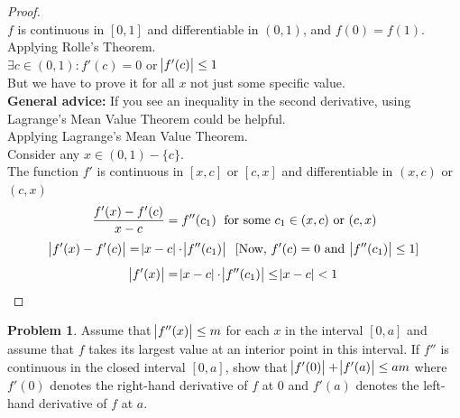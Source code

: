 \documentclass[14]{article}
\theoremstyle{definition}
\newtheorem{prob}{Problem}
\theoremstyle{case}
\begin{document}
\begin{proof} $\text{}$\\
$f$ is continuous in $[0, 1]$ and differentiable in $(0, 1)$, and $f(0) = f(1)$. Applying Rolle's Theorem.\\
$\exists c \in (0, 1) : f'(c) = 0$ or $\abs{f'(c)} \leq 1$\\
But we have to prove it for all $x$ not just some specific value.\\
\textbf{General advice:} If you see an inequality in the second derivative, using Lagrange's Mean Value Theorem could be helpful.\\
Applying Lagrange's Mean Value Theorem.\\
Consider any $x \in (0, 1) - \{c\}$.\\
The function $f'$ is continuous in $[x, c]$ or $[c, x]$ and differentiable in $(x, c)$ or $(c, x)$
\[\dfrac{f'(x) - f'(c)}{x - c} = f''(c_1) \text{\; for some } c_1 \in (x, c) \text{ or } (c, x)\]
\[\abs{f'(x) - f'(c)} = \abs{x - c} \cdot \abs{f''(c_1)} \;\; [\text{Now, } f'(c) = 0 \text{ and } \abs{f''(c_1)} \leq 1 ]\]
\[\abs{f'(x)} = \abs{x - c} \cdot \abs{f''(c_1)} \leq \abs{x - c} < 1\]
\end{proof}
\pagebreak
\begin{prob}
Assume that $\abs{f''(x)} \leq m$ for each $x$ in the interval $[0, a]$ and assume that $f$ takes its largest value at an interior point in this interval. If $f''$ is continuous in the closed interval $[0, a]$, show that $\abs{f'(0)} + \abs{f'(a)}\leq am$ where $f'(0)$ denotes the right-hand derivative of $f$ at $0$ and $f'(a)$ denotes the left-hand derivative of $f$ at $a$.
\end{prob}
\end{document}
